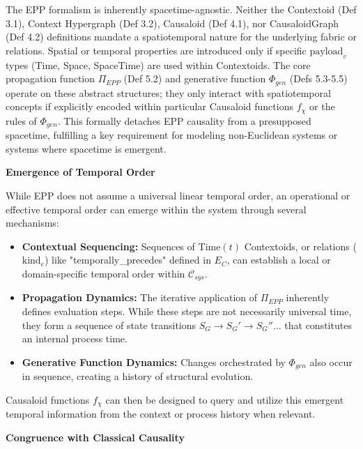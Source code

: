 The EPP formalism is inherently spacetime-agnostic. Neither the Contextoid (Def 3.1), Context Hypergraph (Def 3.2), Causaloid (Def 4.1), nor CausaloidGraph (Def 4.2) definitions mandate a spatiotemporal nature for the underlying fabric or relations. Spatial or temporal properties are introduced only if specific \(\text{payload}_v\) types (Time, Space, SpaceTime) are used within Contextoids. The core propagation function \(\Pi_{EPP}\) (Def 5.2) and generative function \(\Phi_{gen}\) (Defs 5.3-5.5) operate on these abstract structures; they only interact with spatiotemporal concepts if explicitly encoded within particular Causaloid functions \(f_\chi\) or the rules of \(\Phi_{gen}\). This formally detaches EPP causality from a presupposed spacetime, fulfilling a key requirement for modeling non-Euclidean systems or systems where spacetime is emergent.


\textbf{Emergence of Temporal Order}

While EPP does not assume a universal linear temporal order, an operational or effective temporal order can emerge within the system through several mechanisms:
\begin{itemize}
    \item \textbf{Contextual Sequencing:} Sequences of \(\text{Time}(t)\) Contextoids, or relations (\(\text{kind}_e\)) like "temporally\_precedes" defined in \(E_C\), can establish a local or domain-specific temporal order within \(\mathcal{C}_{sys}\).
    \item \textbf{Propagation Dynamics:} The iterative application of \(\Pi_{EPP}\) inherently defines evaluation steps. While these steps are not necessarily universal time, they form a sequence of state transitions \(S_G \to S_G' \to S_G'' \dots\) that constitutes an internal process time.
    \item \textbf{Generative Function Dynamics:} Changes orchestrated by \(\Phi_{gen}\) also occur in sequence, creating a history of structural evolution.
\end{itemize}
Causaloid functions \(f_\chi\) can then be designed to query and utilize this emergent temporal information from the context or process history when relevant.


\textbf{Congruence with Classical Causality}

